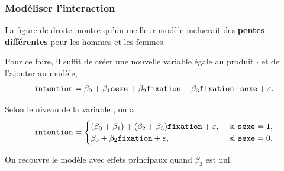 \documentclass[xcolor={dvipsnames}]{beamer}
\begin{document}
\begin{frame}[fragile]
\frametitle{Modéliser l'interaction}
\bi 
\item La figure de droite montre qu'un meilleur modèle incluerait des \alert{\textbf{pentes différentes}} pour les hommes et les femmes.
\item  Pour ce faire, il suffit de  \alert{créer une nouvelle variable égale au produit}  $\cdot$  et de l'ajouter au modèle,
{\small 
\begin{align*}
\texttt{intention} = \beta_0 + \beta_1 \texttt{sexe} + \beta_2\texttt{fixation} + \beta_3 \texttt{fixation}\cdot \texttt{sexe} + \varepsilon.
\end{align*} 
}
\item Selon le niveau de la variable , on a
{\small 
\begin{align*}
\texttt{intention} = 
\begin{cases}
(\beta_0 + \beta_1) + (\beta_2 + \beta_3)\texttt{fixation} + \varepsilon, & \text{ si } \texttt{sexe}=1,\\
  \beta_0 + \beta_2 \texttt{fixation} + \varepsilon, & \text{ si } \texttt{sexe}=0.                  
\end{cases}
\end{align*} 
}
\item On recouvre le modèle avec  \alert{effets principaux}  quand $\beta_3$ est nul. 
\ei
\end{frame}
\end{document}
